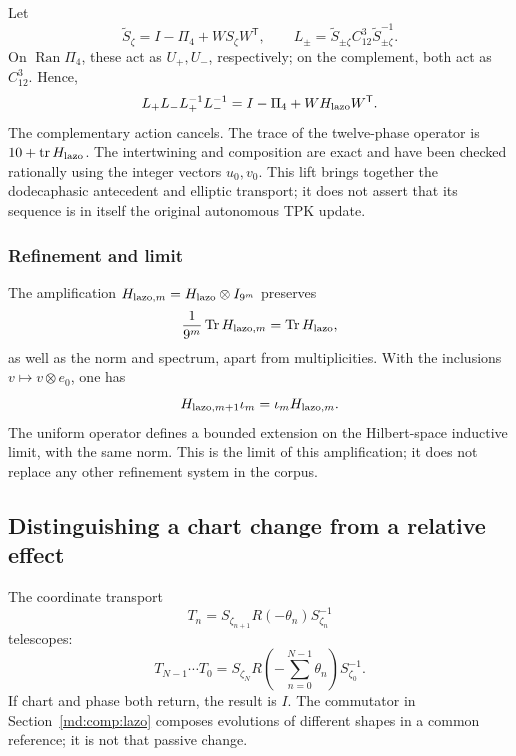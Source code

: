 Let
\[
 \widetilde S_\zeta=I-\Pi_4+WS_\zeta W^{\mathsf T},\qquad
 L_\pm=\widetilde S_{\pm\zeta}C_{12}^3
       \widetilde S_{\pm\zeta}^{-1}.
\]
On \(\operatorname{Ran}\Pi_4\), these act as \(U_+,U_-\),
respectively; on the complement, both act as \(C_{12}^3\). Hence,
\begin{equation}
 L_+L_-L_+^{-1}L_-^{-1}
 =I-\Pi_4+WH_{\rm lazo}W^{\mathsf T}.
 \label{md:comp:levantamiento-lazo}
\end{equation}
The complementary action cancels. The trace of the twelve-phase
operator is \(10+\operatorname{tr}H_{\rm lazo}\).
The intertwining and composition are exact and have been checked
rationally using the integer vectors \(u_0,v_0\).
This lift brings together the dodecaphasic antecedent and elliptic
transport; it does not assert that its sequence is in itself the
original autonomous TPK update.

\subsubsection{Refinement and limit}
\label{md:comp:limite}

The amplification
\(H_{{\rm lazo},m}=H_{\rm lazo}\otimes I_{9^m}\) preserves
\[
 \frac{1}{9^m}\operatorname{Tr}H_{{\rm lazo},m}
 =\operatorname{Tr}H_{\rm lazo},
\]
as well as the norm and spectrum, apart from multiplicities.
With the inclusions \(v\mapsto v\otimes e_0\), one has
\[
 H_{{\rm lazo},m+1}\iota_m=\iota_m H_{{\rm lazo},m}.
\]
The uniform operator defines a bounded extension on the Hilbert-space
inductive limit, with the same norm. This is the limit of this
amplification; it does not replace any other refinement system in
the corpus.

\subsection{Distinguishing a chart change from a relative effect}
\label{md:comp:carta-efecto}

The coordinate transport
\[
 T_n=S_{\zeta_{n+1}}R(-\theta_n)S_{\zeta_n}^{-1}
\]
telescopes:
\begin{equation}
 T_{N-1}\cdots T_0
 =S_{\zeta_N}R\left(-\sum_{n=0}^{N-1}\theta_n\right)
 S_{\zeta_0}^{-1}.
 \label{md:comp:telescopaje}
\end{equation}
If chart and phase both return, the result is \(I\). The commutator
in Section~\ref{md:comp:lazo} composes evolutions of different shapes
in a common reference; it is not that passive change.


